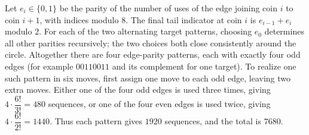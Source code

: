 Let $e_i\in\{0,1\}$ be the parity of the number of uses of the edge joining coin $i$ to coin $i+1$, with indices modulo $8$. The final tail indicator at coin $i$ is $e_{i-1}+e_i$ modulo $2$. For each of the two alternating target patterns, choosing $e_0$ determines all other parities recursively; the two choices both close consistently around the circle. Altogether there are four edge-parity patterns, each with exactly four odd edges (for example $00110011$ and its complement for one target). To realize one such pattern in six moves, first assign one move to each odd edge, leaving two extra moves. Either one of the four odd edges is used three times, giving $4\cdot\dfrac{6!}{3!}=480$ sequences, or one of the four even edges is used twice, giving $4\cdot\dfrac{6!}{2!}=1440$. Thus each pattern gives $1920$ sequences, and the total is $\boxed{7680}$.
